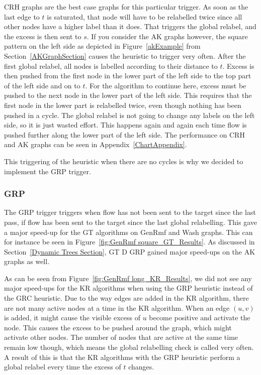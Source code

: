 CRH graphs are the best case graphs for this particular trigger. As soon as the last edge to $t$ is saturated, that node will have to be relabelled twice since all other nodes have a higher label than it does.
That triggers the global relabel, and the excess is then sent to $s$. If you consider the AK graphs however, the square pattern on the left side as depicted in Figure~\ref{akExample} from Section~\ref{AKGraphSection} causes the heuristic to trigger very often.
After the first global relabel, all nodes is labelled according to their distance to $t$. Excess is then pushed from the first node in the lower part of the left side to the top part of the left side and on to $t$.
For the algorithm to continue here, excess must be pushed to the next node in the lower part of the left side. This requires that the first node in the lower part is relabelled twice, even though nothing has been pushed in a cycle.
The global relabel is not going to change any labels on the left side, so it is just wasted effort.
This happens again and again each time flow is pushed further along the lower part of the left side.
The performance on CRH and AK graphs can be seen in Appendix~\ref{ChartAppendix}.

This triggering of the heuristic when there are no cycles is why we decided to implement the GRP trigger.

\subsubsection{GRP}
\label{GRP Section}

The GRP trigger triggers when flow has not been sent to the target since the last pass, if flow has been sent to the target since the last global relabelling.
This gave a major speed-up for the GT algorithms on GenRmf and Wash graphs. This can for instance be seen in Figure~\ref{fig:GenRmf square_GT_Results}. 
As discussed in Section~\ref{Dynamic Trees Section}, GT D GRP gained major speed-ups on the AK graphs as well.

As can be seen from Figure~\ref{fig:GenRmf long_KR_Results}, we did not see any major speed-ups for the KR algorithms when using the GRP heuristic instead of the GRC heuristic. 
Due to the way edges are added in the KR algorithm, there are not many active nodes at a time in the KR algorithm.
When an edge $(u, v)$ is added, it might cause the visible excess of $u$ become positive and activate the node.
This causes the excess to be pushed around the graph, which might activate other nodes.
The number of nodes that are active at the same time remain low though, which means the global relabelling check is called very often.
A result of this is that the KR algorithms with the GRP heuristic perform a global relabel every time the excess of $t$ changes.

